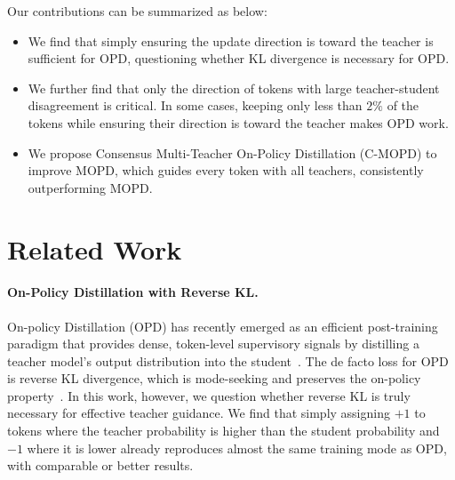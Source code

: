 \documentclass{article}
\theoremstyle{remark}
\begin{document}
Our contributions can be summarized as below:
\begin{itemize}
    \item We find that simply ensuring the update direction is toward the teacher is sufficient for OPD, questioning whether KL divergence is necessary for OPD.
    \item We further find that only the direction of tokens with large teacher-student disagreement is critical. In some cases, keeping only less than \(2\%\) of the tokens while ensuring their direction is toward the teacher makes OPD work. 
    \item We propose Consensus Multi-Teacher On-Policy Distillation (C-MOPD) to improve MOPD, which guides every token with all teachers, consistently outperforming MOPD.
\end{itemize}


\section{Related Work}\label{sec:related_work}


\paragraph{On-Policy Distillation with Reverse KL.}
On-policy Distillation (OPD) has recently emerged as an efficient post-training paradigm that provides dense, token-level supervisory signals by distilling a teacher model's output distribution into the student~\citep{xu2026deepseek,xiao2026mimo,yang2025qwen3,zeng2026glm,agarwal2024policy,li2026rethinking}. The de facto loss for OPD is reverse KL divergence, which is mode-seeking and preserves the on-policy property~\citep{zhao2026decoupling, agarwal2024policy,shao2026token,song2026survey,wu2025rethinking,zhang2026fast}. In this work, however, we question whether reverse KL is truly necessary for effective teacher guidance. We find that simply assigning \(+1\) to tokens where the teacher probability is higher than the student probability and \(-1\) where it is lower already reproduces almost the same training mode as OPD, with comparable or better results.
\end{document}
